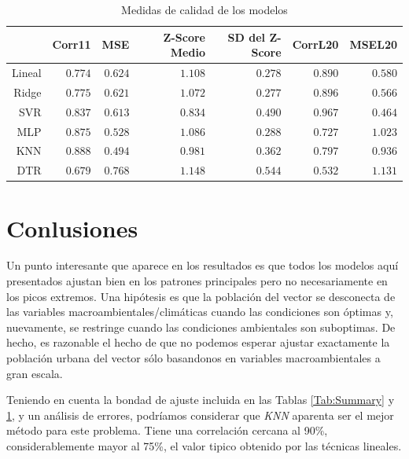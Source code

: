   \begin{table}[hbt]
  \centering
  \caption{Medidas de calidad de los modelos}\label{Tab:Quality}
  \begin{tabular}{*7{r}}
  \toprule
  & Corr11
  & MSE
  & Z-Score Medio
  & SD del Z-Score
  & CorrL20
  & MSEL20 \\ \midrule
  Lineal
  &$0.774$
  &$0.624$
  &$1.108$%
  &$0.278$
  &$0.890$
  &$0.580$\\
  Ridge
  &$0.775$
  &$0.621$
  &$1.072$
  &$0.277$
  &$0.896$
  &$0.566$ \\
  SVR
  &$0.837$
  &$0.613$
  &\boldmath$0.834$   %
  &$0.490$
  &\boldmath$0.967$
  &\boldmath$0.464$ \\
  MLP
  &$0.875$
  &$0.528$
  &$1.086$
  &$0.288$
  &$0.727$
  &$1.023$ \\
  KNN
  &\boldmath$0.888$
  &\boldmath$0.494$
  &$0.981$
  &$0.362$
  &$0.797$
  &$0.936$\\
  DTR
  &$0.679$
  &$0.768$
  &$1.148$
  &$0.544$
  &$0.532$
  &$1.131$ \\
  \bottomrule
  \end{tabular}
  \end{table}

  \section{Conlusiones}

    \par Un punto interesante que aparece en los resultados es que todos los
      modelos aquí presentados ajustan bien en los patrones principales
      pero no necesariamente en los picos extremos. Una hipótesis es que la población
      del vector se desconecta de las variables macroambientales/climáticas
      cuando las condiciones son óptimas y, nuevamente, se restringe cuando las
      condiciones ambientales son suboptimas. De hecho, es razonable el hecho de
      que no podemos esperar ajustar exactamente la población urbana del vector
      sólo basandonos en variables macroambientales a gran escala.


    \par Teniendo en cuenta la bondad de ajuste incluida en las Tablas
      \ref{Tab:Summary} y \ref{Tab:Quality}, y un análisis de errores, podríamos
      considerar que \textit{KNN} aparenta ser el mejor método para este problema.
      Tiene una correlación cercana al 90\%, considerablemente mayor al
      75\%, el valor tipico obtenido por las técnicas lineales.

